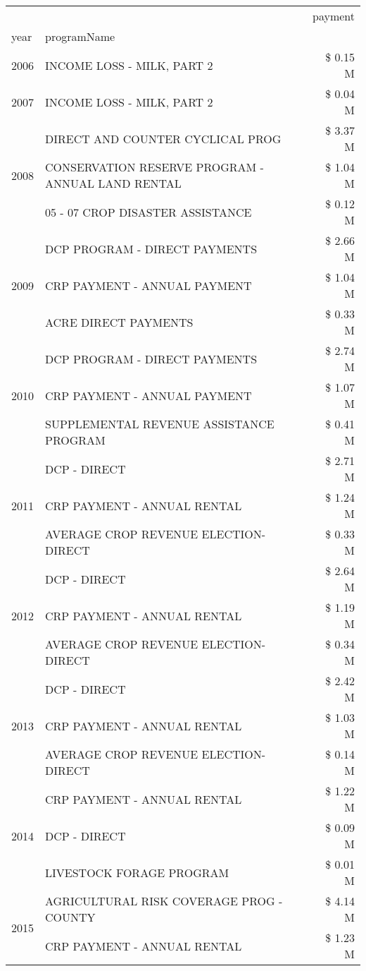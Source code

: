 \begin{tabular}{llr}
\toprule
 &  & payment \\
year & programName &  \\
\midrule
2006 & INCOME LOSS - MILK, PART 2 & \$ 0.15 M \\
\cline{1-3}
2007 & INCOME LOSS - MILK, PART 2 & \$ 0.04 M \\
\cline{1-3}
\multirow[t]{3}{*}{2008} & DIRECT AND COUNTER CYCLICAL PROG & \$ 3.37 M \\
 & CONSERVATION RESERVE PROGRAM - ANNUAL LAND RENTAL & \$ 1.04 M \\
 & 05 - 07 CROP DISASTER ASSISTANCE & \$ 0.12 M \\
\cline{1-3}
\multirow[t]{3}{*}{2009} & DCP PROGRAM - DIRECT PAYMENTS & \$ 2.66 M \\
 & CRP PAYMENT - ANNUAL PAYMENT & \$ 1.04 M \\
 & ACRE DIRECT PAYMENTS & \$ 0.33 M \\
\cline{1-3}
\multirow[t]{3}{*}{2010} & DCP PROGRAM - DIRECT PAYMENTS & \$ 2.74 M \\
 & CRP PAYMENT - ANNUAL PAYMENT & \$ 1.07 M \\
 & SUPPLEMENTAL REVENUE ASSISTANCE PROGRAM & \$ 0.41 M \\
\cline{1-3}
\multirow[t]{3}{*}{2011} & DCP - DIRECT & \$ 2.71 M \\
 & CRP PAYMENT - ANNUAL RENTAL & \$ 1.24 M \\
 & AVERAGE CROP REVENUE ELECTION-DIRECT & \$ 0.33 M \\
\cline{1-3}
\multirow[t]{3}{*}{2012} & DCP - DIRECT & \$ 2.64 M \\
 & CRP PAYMENT - ANNUAL RENTAL & \$ 1.19 M \\
 & AVERAGE CROP REVENUE ELECTION-DIRECT & \$ 0.34 M \\
\cline{1-3}
\multirow[t]{3}{*}{2013} & DCP - DIRECT & \$ 2.42 M \\
 & CRP PAYMENT - ANNUAL RENTAL & \$ 1.03 M \\
 & AVERAGE CROP REVENUE ELECTION-DIRECT & \$ 0.14 M \\
\cline{1-3}
\multirow[t]{3}{*}{2014} & CRP PAYMENT - ANNUAL RENTAL & \$ 1.22 M \\
 & DCP - DIRECT & \$ 0.09 M \\
 & LIVESTOCK FORAGE PROGRAM & \$ 0.01 M \\
\cline{1-3}
\multirow[t]{2}{*}{2015} & AGRICULTURAL RISK COVERAGE PROG - COUNTY & \$ 4.14 M \\
 & CRP PAYMENT - ANNUAL RENTAL & \$ 1.23 M \\

\end{tabular}
